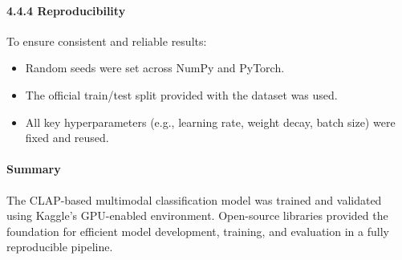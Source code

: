 \paragraph{4.4.4 Reproducibility\\}
To ensure consistent and reliable results:
\begin{itemize}
    \item Random seeds were set across NumPy and PyTorch.
    \item The official train/test split provided with the dataset was used.
    \item All key hyperparameters (e.g., learning rate, weight decay, batch size) were fixed and reused.
\end{itemize}

\paragraph{Summary\\}
The CLAP-based multimodal classification model was trained and validated using Kaggle's GPU-enabled environment. Open-source libraries provided the foundation for efficient model development, training, and evaluation in a fully reproducible pipeline.

